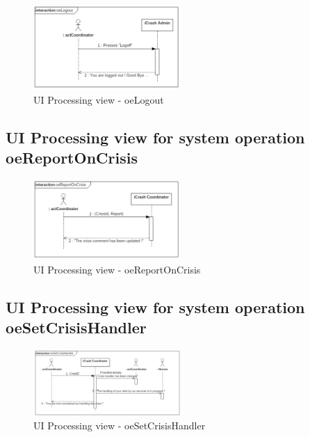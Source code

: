 \begin{figure}[h]
	\centering	
	\captionsetup{justification=centering}
	\includegraphics[width=0.5\textwidth]{./images/ui_oeLogout.eps}
	\caption{UI Processing view - oeLogout}
\end{figure}


\subsection{UI Processing view for system operation oeReportOnCrisis}

\begin{figure}[h]
	\centering	
	\captionsetup{justification=centering}
	\includegraphics[width=0.5\textwidth]{./images/ui_oeReportOnCrisis.eps}
	\caption{UI Processing view - oeReportOnCrisis}
\end{figure}


\subsection{UI Processing view for system operation oeSetCrisisHandler}

\begin{figure}[h]
	\centering	
	\captionsetup{justification=centering}
	\includegraphics[width=0.5\textwidth]{./images/ui_oeSetCrisisHandler.eps}
	\caption{UI Processing view - oeSetCrisisHandler}
\end{figure}


